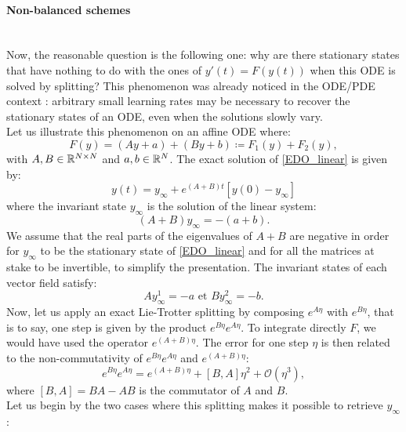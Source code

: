 \paragraph{Non-balanced schemes}
~~\\
Now, the reasonable question is the following one: why are there stationary states that have nothing to do with the ones of $y'(t)=F(y(t))$ when this ODE is solved by splitting? This phenomenon was already noticed in the ODE/PDE context \cite{rebalanced_splitting}: arbitrary small learning rates may be necessary to recover the stationary states of an ODE, even when the solutions slowly vary. \\
Let us illustrate this phenomenon on an affine ODE where:
\begin{equation}
	F(y) = \left(Ay+a\right) + \left(By+b\right) \coloneqq F_1(y) + F_2(y),
	\label{EDO_linear}
\end{equation}
with $A,B \in \mathbb{R}^{N \times N}$ and $a,b \in \mathbb{R}^N$. The exact solution of \eqref{EDO_linear} is given by:
\begin{equation*}
	y(t) = y_{\infty} + e^{(A+B)t}\left[y(0)-y_{\infty}\right]
\end{equation*}
where the invariant state $y_{\infty}$ is the solution of the linear system:
\begin{equation*}
	(A+B)y_{\infty} = -(a+b).
\end{equation*}
We assume that the real parts of the eigenvalues of $A+B$ are negative in order for $y_{\infty}$ to be the stationary state of \eqref{EDO_linear} and for all the matrices at stake to be invertible, to simplify the presentation. The invariant states of each vector field satisfy:
\begin{equation*}
	Ay_{\infty}^1 = -a \text{ et } By_{\infty}^2 = -b.
\end{equation*}
Now, let us apply an exact Lie-Trotter splitting by composing $e^{A\eta}$ with $e^{B\eta}$, that is to say, one step is given by the product $e^{B\eta}e^{A\eta}$. To integrate
directly $F$, we would have used the operator $e^{(A+B)\eta}$. The error for one step $\eta$ is then related to the non-commutativity of $e^{B\eta}e^{A\eta}$ and $e^{(A+B)\eta}$:
\begin{equation}
	e^{B\eta}e^{A\eta} = e^{(A+B)\eta} + \left[B,A\right]\eta^2 + \mathcal{O}(\eta^3),
	\label{Taylor_split}
\end{equation}
where $\left[B,A\right]=BA-AB$ is the commutator of $A$ and $B$.\\
Let us begin by the two cases where this splitting makes it possible to retrieve $y_{\infty}$:
